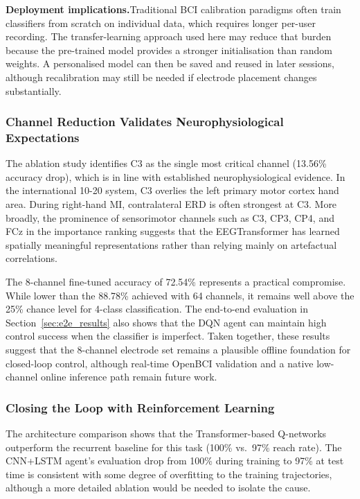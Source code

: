 \documentclass[12pt, a4paper]{article}
\begin{document}
\textbf{Deployment implications.}\quad Traditional BCI calibration paradigms often train classifiers from scratch on individual data, which requires longer per-user recording. The transfer-learning approach used here may reduce that burden because the pre-trained model provides a stronger initialisation than random weights. A personalised model can then be saved and reused in later sessions, although recalibration may still be needed if electrode placement changes substantially.

\subsubsection{Channel Reduction Validates Neurophysiological Expectations}

The ablation study identifies C3 as the single most critical channel (13.56\% accuracy drop), which is in line with established neurophysiological evidence. In the international 10-20 system, C3 overlies the left primary motor cortex hand area. During right-hand MI, contralateral ERD is often strongest at C3. More broadly, the prominence of sensorimotor channels such as C3, CP3, CP4, and FCz in the importance ranking suggests that the EEGTransformer has learned spatially meaningful representations rather than relying mainly on artefactual correlations.

The 8-channel fine-tuned accuracy of 72.54\% represents a practical compromise. While lower than the 88.78\% achieved with 64 channels, it remains well above the 25\% chance level for 4-class classification. The end-to-end evaluation in Section~\ref{sec:e2e_results} also shows that the DQN agent can maintain high control success when the classifier is imperfect. Taken together, these results suggest that the 8-channel electrode set remains a plausible offline foundation for closed-loop control, although real-time OpenBCI validation and a native low-channel online inference path remain future work.

\subsubsection{Closing the Loop with Reinforcement Learning}

The architecture comparison shows that the Transformer-based Q-networks outperform the recurrent baseline for this task (100\% vs.~97\% reach rate). The CNN+LSTM agent's evaluation drop from 100\% during training to 97\% at test time is consistent with some degree of overfitting to the training trajectories, although a more detailed ablation would be needed to isolate the cause.
\end{document}
